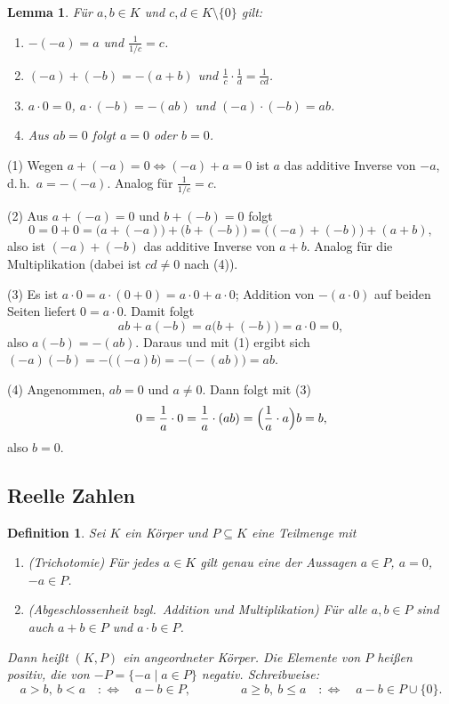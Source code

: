 \documentclass[a4paper]{article}
\makeatletter
\theoremstyle{kurzskript}
\newtheorem{definition}[satz]{Definition}
\newtheorem{lemma}[satz]{Lemma}
\renewenvironment{proof}[1][\proofname]{\par\pushQED{\qed}%
  \normalfont\topsep\medskipamount\relax
  \trivlist\item[\hskip\labelsep\bfseries #1\@addpunct{.}]\ignorespaces}%
  {\popQED\endtrivlist\@endpefalse}
\renewcommand{\proofname}{Beweis}
\makeatother
\begin{document}
\begin{lemma}\label{lem:rechenregeln}
Für $a, b \in K$ und $c, d \in K \setminus \{0\}$ gilt:
\begin{enumerate}[label=(\arabic*)]
  \item $-(-a) = a$ und $\frac{1}{1/c} = c$.
  \item $(-a) + (-b) = -(a + b)$ und $\frac{1}{c} \cdot \frac{1}{d} = \frac{1}{cd}$.
  \item $a \cdot 0 = 0$, $a \cdot (-b) = -(ab)$ und $(-a) \cdot (-b) = ab$.
  \item Aus $ab = 0$ folgt $a = 0$ oder $b = 0$.
\end{enumerate}
\end{lemma}

\begin{proof}
(1) Wegen $a + (-a) = 0 \iff (-a) + a = 0$ ist $a$ das additive Inverse von $-a$, d.\,h.\ $a = -(-a)$. Analog für $\frac{1}{1/c} = c$.

(2) Aus $a + (-a) = 0$ und $b + (-b) = 0$ folgt
\[
  0 = 0 + 0 = \bigl(a + (-a)\bigr) + \bigl(b + (-b)\bigr) = \bigl((-a) + (-b)\bigr) + (a + b),
\]
also ist $(-a) + (-b)$ das additive Inverse von $a + b$. Analog für die Multiplikation (dabei ist $cd \neq 0$ nach (4)).

(3) Es ist $a \cdot 0 = a \cdot (0 + 0) = a \cdot 0 + a \cdot 0$; Addition von $-(a \cdot 0)$ auf beiden Seiten liefert $0 = a \cdot 0$. Damit folgt
\[
  ab + a(-b) = a\bigl(b + (-b)\bigr) = a \cdot 0 = 0,
\]
also $a(-b) = -(ab)$. Daraus und mit (1) ergibt sich $(-a)(-b) = -\bigl((-a)b\bigr) = -\bigl(-(ab)\bigr) = ab$.

(4) Angenommen, $ab = 0$ und $a \neq 0$. Dann folgt mit (3)
\[
  0 = \frac{1}{a} \cdot 0 = \frac{1}{a} \cdot (a b) = \Bigl(\frac{1}{a} \cdot a\Bigr) b = b,
\]
also $b = 0$.
\end{proof}

\subsection{Reelle Zahlen}

\begin{definition}
Sei $K$ ein Körper und $P \subseteq K$ eine Teilmenge mit
\begin{enumerate}[label=(O\arabic*)]
  \item (\emph{Trichotomie}) Für jedes $a \in K$ gilt \emph{genau eine} der Aussagen $a \in P$, $a = 0$, $-a \in P$.
  \item (\emph{Abgeschlossenheit bzgl.\ Addition und Multiplikation}) Für alle $a, b \in P$ sind auch $a + b \in P$ und $a \cdot b \in P$.
\end{enumerate}
Dann heißt $(K, P)$ ein \emph{angeordneter Körper}. Die Elemente von $P$ heißen \emph{positiv}, die von $-P = \{-a \mid a \in P\}$ \emph{negativ}. Schreibweise:
\[
  a > b,\ b < a \quad :\iff \quad a - b \in P,
  \qquad\qquad
  a \geq b,\ b \leq a \quad :\iff \quad a - b \in P \cup \{0\}.
\]
\end{definition}
\end{document}
